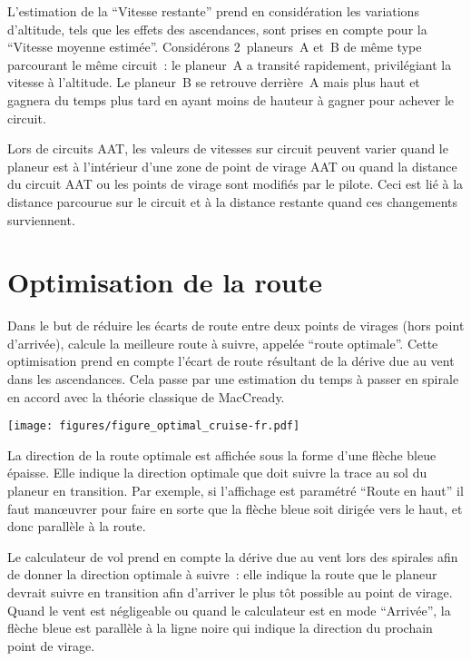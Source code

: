 L'estimation de la ``Vitesse restante'' prend en considération les variations d'altitude, tels que les effets des ascendances, sont prises en compte pour la ``Vitesse moyenne estimée''.
Considérons 2~planeurs~A et~B de même type parcourant le même circuit~: le planeur~A a transité rapidement, privilégiant la vitesse à l'altitude.
Le planeur~B se retrouve derrière~A mais plus haut et gagnera du temps plus tard en ayant moins de hauteur à gagner pour achever le circuit.

Lors de circuits AAT, les valeurs de vitesses sur circuit peuvent varier quand le planeur est à l'intérieur d'une zone de point de virage AAT ou quand la distance du circuit AAT ou les points de virage sont modifiés par le pilote.
Ceci est lié à la distance parcourue sur le circuit et à la distance restante quand ces changements surviennent.


\section{Optimisation de la route}

Dans le but de réduire les écarts de route entre deux points de virages (hors point d'arrivée), \xc{} calcule la meilleure route à suivre, appelée ``route optimale''.
Cette optimisation prend en compte l'écart de route résultant de la dérive due au vent dans les ascendances.
Cela passe par une estimation du temps à passer en spirale en accord avec la théorie classique de MacCready.

\begin{center}
\begin{maxipage}
\centering
\def\svgwidth{0.8\linewidth}
\texttt{[image: figures/figure\_optimal\_cruise-fr.pdf]}
\end{maxipage}
\end{center}

La direction de la route optimale est affichée sous la forme d'une flèche bleue épaisse.
Elle indique la direction optimale que doit suivre la trace au sol du planeur en transition.
Par exemple, si l'affichage est paramétré ``Route en haut'' il faut manœuvrer pour faire en sorte que la flèche bleue soit dirigée vers le haut, et donc parallèle à la route.

Le calculateur de vol prend en compte la dérive due au vent lors des spirales afin de donner la direction optimale à suivre~: elle indique la route que le planeur devrait suivre en transition afin d'arriver le plus tôt possible au point de virage.
Quand le vent est négligeable ou quand le calculateur est en mode ``Arrivée'', la flèche bleue est parallèle à la ligne noire qui indique la direction du prochain point de virage.

